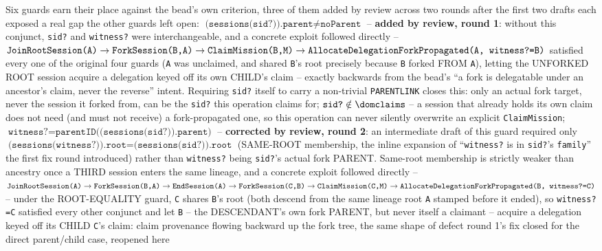\documentclass[a4paper,10pt,fleqn]{article}
\newcommand{\field}[1]{\texttt{#1}}
\begin{document}
Six guards earn their place against the bead's own criterion, three of
them added by review across two rounds after the first two drafts each
exposed a real gap the other guards left open:
$\field{(sessions(sid?)).parent} \neq \field{noParent}$ -- \textbf{added
by review, round 1}: without this conjunct, \field{sid?} and
\field{witness?} were interchangeable, and a concrete exploit followed
directly --
$\field{JoinRootSession(A)} \to \field{ForkSession(B,A)} \to
\field{ClaimMission(B,M)} \to
\field{AllocateDelegationForkPropagated(A, \field{witness?}=B)}$
satisfied every one of the original four guards (\field{A} was
unclaimed, and shared \field{B}'s root precisely because \field{B}
forked FROM \field{A}), letting the UNFORKED ROOT session acquire a
delegation keyed off its own CHILD's claim -- exactly backwards from
the bead's ``a fork is delegatable under an ancestor's claim, never the
reverse'' intent. Requiring \field{sid?} itself to carry a non-trivial
\field{PARENTLINK} closes this: only an actual fork target, never the
session it forked from, can be the \field{sid?} this operation claims
for; $\field{sid?} \notin \dom \field{claims}$ -- a session that already
holds its own claim does not need (and must not receive) a
fork-propagated one, so this operation can never silently overwrite an
explicit \field{ClaimMission};
$\field{witness?} = \field{parentID((sessions(sid?)).parent)}$ --
\textbf{corrected by review, round 2}: an intermediate draft of this
guard required only $\field{(sessions(witness?)).root} =
\field{(sessions(sid?)).root}$ (SAME-ROOT membership, the inline
expansion of ``\field{witness?} is in \field{sid?}'s \field{family}''
the first fix round introduced) rather than \field{witness?} being
\field{sid?}'s actual fork PARENT. Same-root membership is strictly
weaker than ancestry once a THIRD session enters the same lineage, and
a concrete exploit followed directly --
$\field{JoinRootSession(A)} \to \field{ForkSession(B,A)} \to
\field{EndSession(A)} \to \field{ForkSession(C,B)} \to
\field{ClaimMission(C,M)} \to
\field{AllocateDelegationForkPropagated(B, \field{witness?}=C)}$ --
under the ROOT-EQUALITY guard, \field{C} shares \field{B}'s root (both
descend from the same lineage root \field{A} stamped before it ended),
so \field{witness?=C} satisfied every other conjunct and let \field{B}
-- the DESCENDANT's own fork PARENT, but never itself a claimant --
acquire a delegation keyed off its CHILD \field{C}'s claim: claim
provenance flowing backward up the fork tree, the same shape of defect
round 1's fix closed for the direct parent/child case, reopened here
\end{document}
